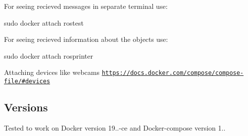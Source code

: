For seeing recieved messages in separate terminal use\+:

{\ttfamily sudo docker attach rostest}

For seeing recieved information about the objects use\+:

{\ttfamily sudo docker attach rosprinter}

Attaching devices like webcams \href{https://docs.docker.com/compose/compose-file/#devices}{\tt https\+://docs.\+docker.\+com/compose/compose-\/file/\#devices}

\subsection*{Versions}

Tested to work on Docker version 19..-\/ce and Docker-\/compose version 1.. 